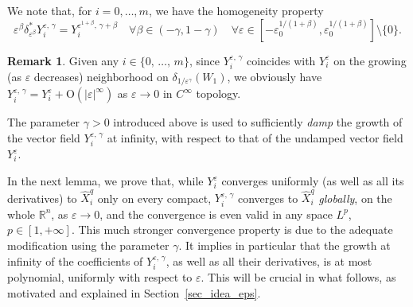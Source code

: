 \documentclass[10pt]{amsart}
\theoremstyle{definition}\newtheorem{defi}[theo]{Definition}\newtheorem{rema}[theo]{Remark}\newtheorem{exam}[theo]{Example}\newtheorem{exem}[theo]{Example}\newtheorem{nota}[theo]{Notation}
\newcommand*\R{\mathbb{R}}
\newcommand{\rmO}{\mathrm{O}}
\let\oldforall\forall
\renewcommand*{\forall}{\mathrel{\oldforall}}
\begin{document}
We note that, for $i=0,\ldots,m$, we have the homogeneity property
\begin{equation}\label{homogYiepsgamma}
\varepsilon^\beta \delta_{\varepsilon^\beta}^* Y_i^{\varepsilon,\,\gamma} = Y_i^{\varepsilon^{1+\beta},\,\gamma+\beta} \quad \forall\beta\in(-\gamma,1-\gamma) \quad\forall \varepsilon\in \left[-\varepsilon_0^{1/(1+\beta)},\varepsilon_0^{1/(1+\beta)} \right] \setminus\{0\}.
\end{equation}


\begin{rema}\label{rem_comp_Yiepsgamma_Yieps}
Given any $i\in\{0,\,\ldots,\,m\}$, since $Y_i^{\varepsilon,\,\gamma}$ coincides with $Y_i^\varepsilon$ on the growing (as $\varepsilon$ decreases) neighborhood on $\delta_{1/\varepsilon^\gamma}(W_1)$, we obviously have $Y_i^{\varepsilon,\,\gamma} = Y_i^\varepsilon + \rmO(\vert\varepsilon\vert^\infty)$ as $\varepsilon\rightarrow 0$ in $C^\infty$ topology.
\end{rema}



The parameter $\gamma>0$ introduced above is used to sufficiently \emph{damp} the growth of the vector field $Y_i^{\varepsilon,\,\gamma}$ at infinity, with respect to that of the undamped vector field $Y_i^\varepsilon$.

In the next lemma, we prove that, while $Y_i^\varepsilon$ converges uniformly (as well as all its derivatives) to $\widehat{X}_i^{q}$ only on every compact, $Y_i^{\varepsilon,\,\gamma}$ converges to $\widehat{X}_i^{q}$ \emph{globally}, on the whole $\R^n$, as $\varepsilon\rightarrow 0$, and the convergence is even valid in any space $L^p$, $p\in[1,+\infty]$. This much stronger convergence property is due to the adequate modification using the parameter $\gamma$. It implies in particular that the growth at infinity of the coefficients of $Y_i^{\varepsilon,\,\gamma}$, as well as all their derivatives, is at most polynomial, uniformly with respect to $\varepsilon$. This will be crucial in what follows, as motivated and explained in Section~\ref{sec_idea_eps}.
\end{document}
